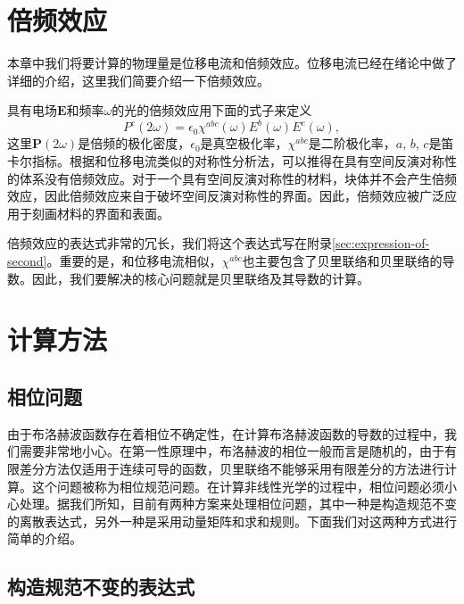 \section{倍频效应}
本章中我们将要计算的物理量是位移电流和倍频效应。位移电流已经在绪论中做了详细的介绍，这里我们简要介绍一下倍频效应。

具有电场$\boldsymbol{E}$和频率$\omega$的光的倍频效应用下面的式子来定义
\begin{equation}
P^{c}(2\omega)=\epsilon_0\chi^{abc}(\omega)E^{b}(\omega)E^{c}(\omega),
\end{equation}
这里$\boldsymbol{P}(2\omega)$是倍频的极化密度，$\epsilon_0$是真空极化率，$\chi^{abc}$是二阶极化率，$a$, $b$, $c$是笛卡尔指标。根据和位移电流类似的对称性分析法，可以推得在具有空间反演对称性的体系没有倍频效应。对于一个具有空间反演对称性的材料，块体并不会产生倍频效应，因此倍频效应来自于破坏空间反演对称性的界面。因此，倍频效应被广泛应用于刻画材料的界面和表面。

倍频效应的表达式非常的冗长\cite{rashkeev_efficient_1998}，我们将这个表达式写在附录\ref{sec:expression-of-second}。重要的是，和位移电流相似，$\chi^{abc}$也主要包含了贝里联络和贝里联络的导数。因此，我们要解决的核心问题就是贝里联络及其导数的计算。

\section{计算方法}
\subsection{相位问题}

由于布洛赫波函数存在着相位不确定性，在计算布洛赫波函数的导数的过程中，我们需要非常地小心。在第一性原理中，布洛赫波的相位一般而言是随机的，由于有限差分方法仅适用于连续可导的函数，贝里联络不能够采用有限差分的方法进行计算。这个问题被称为相位规范问题。在计算非线性光学的过程中，相位问题必须小心处理。据我们所知，目前有两种方案来处理相位问题，其中一种是构造规范不变的离散表达式，另外一种是采用动量矩阵和求和规则。下面我们对这两种方式进行简单的介绍。


\subsection{构造规范不变的表达式}

